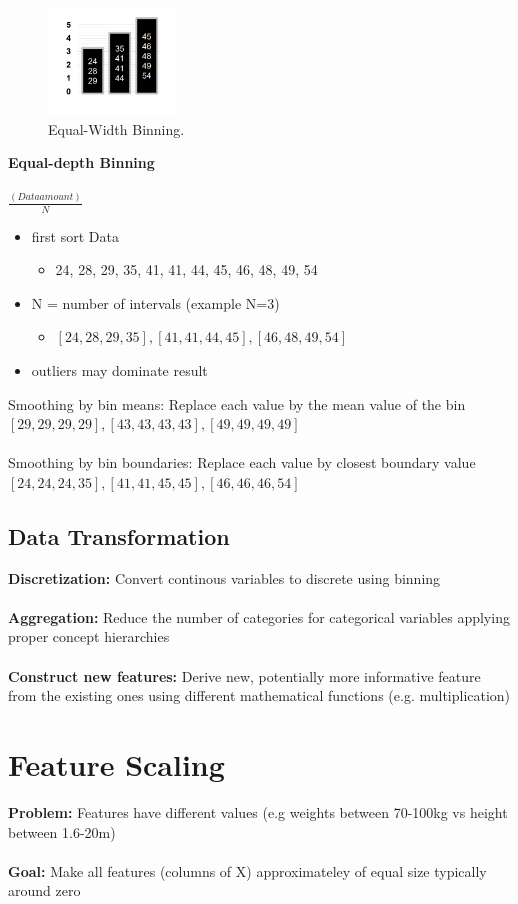 \documentclass[../MLDM_Main.tex]{subfiles}
\begin{document}
\begin{figure}[H]
\centering
\includegraphics[width=0.3\textwidth]{images/EqualWidthBinning.png}
\caption{\label{fig:Equal-Width Binning}Equal-Width Binning.}
\end{figure}

\textbf{Equal-depth Binning}\\\\
$\frac{(Data amount)}{N}$
\begin{itemize}
	\item first sort Data
	\begin{itemize}
		\item 24, 28, 29, 35, 41, 41, 44, 45, 46, 48, 49, 54
	\end{itemize}
	\item N = number of intervals (example N=3)
	\begin{itemize}
		\item $[24, 28, 29, 35], [41, 41, 44, 45], [46, 48, 49, 54]$
	\end{itemize}
	\item outliers may dominate result
\end{itemize}
\colorbox {pink!60}{Smoothing by bin means:}
Replace each value by the mean value of the bin\\$[29, 29, 29, 29], [43, 43, 43, 43], [49, 49, 49, 49]$\\\\
\colorbox {pink!60}{Smoothing by bin boundaries:}
Replace each value by closest boundary value\\$[24, 24, 24, 35], [41, 41, 45, 45], [46, 46, 46, 54] $

\subsection{Data Transformation}
\textbf{Discretization:} Convert continous variables to discrete using binning\\\\
\textbf{Aggregation:} Reduce the number of categories for categorical variables applying proper concept hierarchies\\\\
\textbf{Construct new features:} Derive new, potentially more informative feature from the existing ones using different mathematical functions (e.g. multiplication)

\section{Feature Scaling}
\textbf{Problem:} Features have different values (e.g weights between 70-100kg vs height between 1.6-20m)\\\\
\textbf{Goal:} Make all features (columns of X) approximateley of equal size typically around zero
\end{document}
